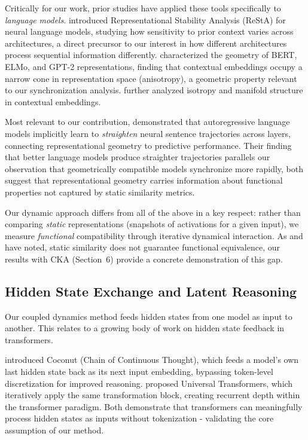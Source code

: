 \documentclass[10pt]{article} %
\theoremstyle{plain}
\theoremstyle{definition}
\theoremstyle{remark}
\begin{document}
Critically for our work, prior studies have applied these tools specifically to \textit{language models}. \citet{abnar2019blackbox} introduced Representational Stability Analysis (ReStA) for neural language models, studying how sensitivity to prior context varies across architectures, a direct precursor to our interest in how different architectures process sequential information differently. \citet{ethayarajh2019contextual} characterized the geometry of BERT, ELMo, and GPT-2 representations, finding that contextual embeddings occupy a narrow cone in representation space (anisotropy), a geometric property relevant to our synchronization analysis. \citet{cai2021isotropy} further analyzed isotropy and manifold structure in contextual embeddings.

Most relevant to our contribution, \citet{hosseini2023straightening} demonstrated that autoregressive language models implicitly learn to \textit{straighten} neural sentence trajectories across layers, connecting representational geometry to predictive performance. Their finding that better language models produce straighter trajectories parallels our observation that geometrically compatible models synchronize more rapidly, both suggest that representational geometry carries information about functional properties not captured by static similarity metrics.

Our dynamic approach differs from all of the above in a key respect: rather than comparing \textit{static} representations (snapshots of activations for a given input), we measure \textit{functional} compatibility through iterative dynamical interaction. As \citet{hauser2021similar} and \citet{nguyen2021wide} have noted, static similarity does not guarantee functional equivalence, our results with CKA (Section~6) provide a concrete demonstration of this gap.

\subsection{Hidden State Exchange and Latent Reasoning}

Our coupled dynamics method feeds hidden states from one model as input to another. This relates to a growing body of work on hidden state feedback in transformers.

\citet{hao2024coconut} introduced Coconut (Chain of Continuous Thought), which feeds a model's own last hidden state back as its next input embedding, bypassing token-level discretization for improved reasoning. \citet{dehghani2019universal} proposed Universal Transformers, which iteratively apply the same transformation block, creating recurrent depth within the transformer paradigm. Both demonstrate that transformers can meaningfully process hidden states as inputs without tokenization - validating the core assumption of our method.
\end{document}

